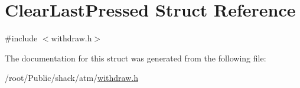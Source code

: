 \hypertarget{structClearLastPressed}{\section{Clear\-Last\-Pressed Struct Reference}
\label{structClearLastPressed}
}


{\ttfamily \#include $<$withdraw.\-h$>$}



The documentation for this struct was generated from the following file\-:\begin{DoxyCompactItemize}
\item 
/root/\-Public/shack/atm/\hyperlink{withdraw_8h}{withdraw.\-h}\end{DoxyCompactItemize}

